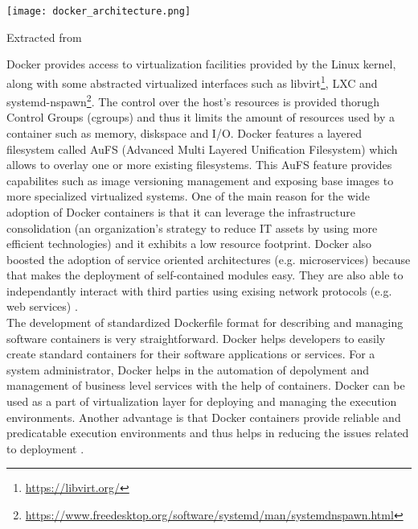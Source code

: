 \begin{center}
\texttt{[image: docker\_architecture.png]}
\label{fig:docker_architecture}
\caption*{Extracted from \cite{docker-documentation}}
\end{center}

Docker provides access to virtualization facilities provided by the Linux kernel, along with some abstracted virtualized interfaces such as libvirt\footnote{\url{https://libvirt.org/}}, LXC and systemd-nspawn\footnote{\url{https://www.freedesktop.org/software/systemd/man/systemdnspawn.html}}. The control over the host's resources is provided thorugh Control Groups (cgroups) and thus it limits the amount of resources used by a container such as memory, diskspace and I/O. Docker features a layered filesystem called AuFS (Advanced Multi Layered Unification Filesystem) which allows to overlay one or more existing filesystems. This AuFS feature provides capabilites such as image versioning management and exposing base images to more specialized virtualized systems. One of the main reason for the wide adoption of Docker containers is that it can leverage the infrastructure consolidation (an organization's strategy to reduce IT assets by using more efficient technologies) and it exhibits a low resource footprint. Docker also boosted the adoption of service oriented architectures (e.g. microservices) because that makes the deployment of self-contained modules easy. They are also able to independantly interact with third parties using exising network protocols (e.g. web services) \cite{Xavier:2013:PEC:2497369.2497577}. \\

The development of standardized Dockerfile format for describing and managing software containers is very straightforward. Docker helps developers to easily create standard containers for their software applications or services. For a system administrator, Docker helps in the automation of depolyment and management of business level services with the help of containers. Docker can be used as a part of virtualization layer for deploying and managing the execution environments. Another advantage is that Docker containers provide reliable and predicatable execution environments and thus helps in reducing the issues related to deployment \cite{DBLP:journals/corr/MorrisVHM17}.

